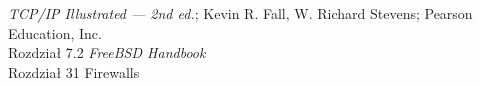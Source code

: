 \begin{thebibliography}{99}
    \emph{TCP/IP Illustrated --- 2nd ed.}; Kevin R. Fall, W. Richard Stevens; Pearson Education, Inc.\\
    Rozdział 7.2
    \emph{FreeBSD Handbook}\\
    Rozdział 31 Firewalls
\end{thebibliography}
